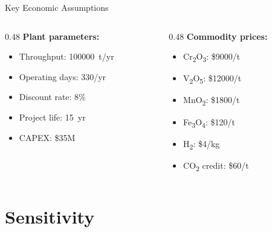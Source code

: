 \documentclass[aspectratio=169]{beamer}
\begin{document}
\begin{frame}{Key Economic Assumptions}
\begin{columns}[T]
\begin{column}{0.48\textwidth}
\textbf{Plant parameters:}
\begin{itemize}
\item Throughput: \num{100000}~t/yr
\item Operating days: 330/yr
\item Discount rate: 8\%
\item Project life: 15~yr
\item CAPEX: \$35M
\end{itemize}
\end{column}
\begin{column}{0.48\textwidth}
\textbf{Commodity prices:}
\begin{itemize}
\item Cr\textsubscript{2}O\textsubscript{3}: \$\num{9000}/t
\item V\textsubscript{2}O\textsubscript{5}: \$\num{12000}/t
\item MnO\textsubscript{2}: \$\num{1800}/t
\item Fe\textsubscript{3}O\textsubscript{4}: \$120/t
\item H\textsubscript{2}: \$4/kg
\item CO\textsubscript{2} credit: \$60/t
\end{itemize}
\end{column}
\end{columns}
\end{frame}

\section{Sensitivity}
\end{document}
